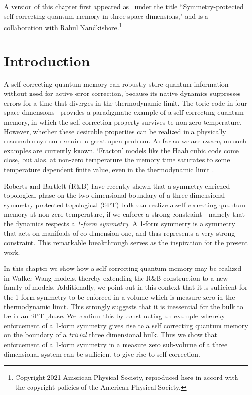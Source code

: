 A version of this chapter first appeared as~\cite{StahlNandkishore2021} under the title ``Symmetry-protected self-correcting quantum memory in three space dimensions," and is a collaboration with Rahul Nandkishore.\footnote{Copyright 2021 American Physical Society, reproduced here in accord with the copyright policies of the American Physical Society.}

\section{Introduction}
A self correcting quantum memory can robustly store quantum information without need for active error correction, because its native dynamics suppresses errors for a time that diverges in the thermodynamic limit. The toric code in four space dimensions~\cite{Kitaev2003Fault} provides a paradigmatic example of a self correcting quantum memory, in which the self correction property survives to non-zero temperature. However, whether these desirable properties can be realized in a physically reasonable system remains a great open problem. As far as we are aware, no such examples are currently known. `Fracton' models like the Haah cubic code \cite{Haah2011Code} come close, but alas, at non-zero temperature the memory time saturates to some temperature dependent finite value, even in the thermodynamic limit \cite{Siva2017Marginally, PremHaahNandkishore2017}. 

Roberts and Bartlett (R\&B) have recently shown \cite{RobertsBartlett2020} that a symmetry enriched topological phase on the two dimensional boundary of a three dimensional symmetry protected topological (SPT) bulk can realize a self correcting quantum memory at non-zero temperature, if we enforce a strong constraint---namely that the dynamics respects a {\it 1-form symmetry}. A 1-form symmetry \cite{Gaiotto2015Generalized, Lake2018Higher, Tong2018Gauge, Wen2019Higher, Qi2021Exotic} is a symmetry that acts on manifolds of co-dimension one, and thus represents a very strong constraint. This remarkable breakthrough serves as the inspiration for the present work. 

In this chapter we show how a self correcting quantum memory may be realized in Walker-Wang models, thereby extending the R\&B construction to a new family of models. Additionally, we point out in this context that it is sufficient for the 1-form symmetry to be enforced in a volume which is measure zero in the thermodynamic limit. This strongly suggests that it is inessential for the bulk to be in an SPT phase. We confirm this by constructing an example whereby enforcement of a 1-form symmetry gives rise to a self correcting quantum memory on the boundary of a {\it trivial} three dimensional bulk. Thus we show that enforcement of a 1-form symmetry in a measure zero sub-volume of a three dimensional system can be sufficient to give rise to self correction. 

